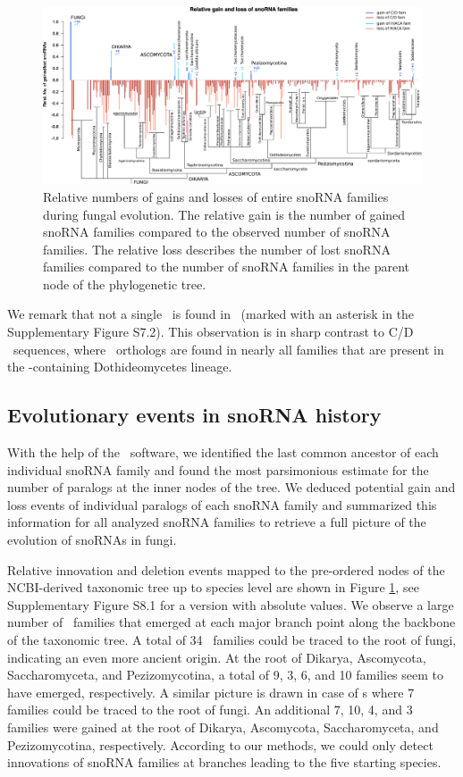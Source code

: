 \begin{figure}
  \centering
  \includegraphics[width=\textwidth]{pics/fungi_relative_gain_loss_PAPERVERSION.eps}
  \caption{Relative numbers of gains and losses of entire snoRNA families
    during fungal evolution. The relative gain is the number of gained
    snoRNA families compared to the observed number of snoRNA families. The
    relative loss describes the number of lost snoRNA families compared to
    the number of snoRNA families in the parent node of the phylogenetic
    tree.}
\label{fig:relative_innovation_deletion_event}
\end{figure}

We remark that not a single \haca\ is found in \Ptt\ (marked with an
asterisk in the Supplementary Figure S7.2). This observation is in
sharp contrast to C/D \sno\ sequences, where \ptt\ orthologs are found in
nearly all families that are present in the \ptt-containing Dothideomycetes
lineage.

\subsection{Evolutionary events in snoRNA history}

With the help of the \epope\ software, we identified the last common
ancestor of each individual snoRNA family and found the most parsimonious
estimate for the number of paralogs at the inner nodes of the tree.  We
deduced potential gain and loss events of individual paralogs of each
snoRNA family and summarized this information for all analyzed snoRNA
families to retrieve a full picture of the evolution of snoRNAs in fungi.

Relative innovation and deletion events mapped to the pre-ordered nodes of
the NCBI-derived taxonomic tree up to species level are shown in Figure
\ref{fig:relative_innovation_deletion_event}, see Supplementary Figure S8.1
for a version with absolute values.  We observe a large number of \sno\
families that emerged at each major branch point along the backbone of the
taxonomic tree. A total of 34 \cd\ families could be traced to the root of
fungi, indicating an even more ancient origin. At the root of Dikarya,
Ascomycota, Saccharomyceta, and Pezizomycotina, a total of 9, 3, 6, and 10
families seem to have emerged, respectively. A similar picture is drawn in case of \haca s
where 7 families could be traced to the root of fungi. An additional 7, 10,
4, and 3 families were gained at the root of Dikarya, Ascomycota,
Saccharomyceta, and Pezizomycotina, respectively.  According to our
methods, we could only detect innovations of snoRNA families at branches
leading to the five starting species.

